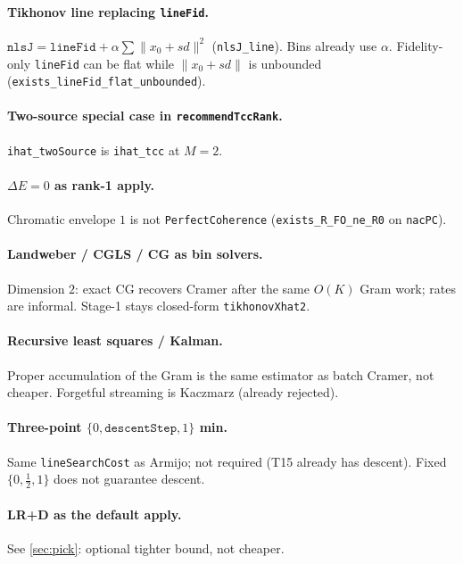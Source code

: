 \documentclass[11pt,a4paper]{article}
\theoremstyle{definition}
\theoremstyle{remark}
\newcommand{\norm}[1]{\lVert#1\rVert}
\begin{document}
\paragraph{Tikhonov line replacing \texttt{lineFid}.}
$\texttt{nlsJ}=\texttt{lineFid}+\alpha\sum\norm{x_0+sd}^2$
(\texttt{nlsJ\_line}).
Bins already use $\alpha$.
Fidelity-only \texttt{lineFid} can be flat while
$\norm{x_0+sd}$ is unbounded
(\texttt{exists\_lineFid\_flat\_unbounded}).

\paragraph{Two-source special case in \texttt{recommendTccRank}.}
\texttt{ihat\_twoSource} is \texttt{ihat\_tcc} at $M=2$.

\paragraph{$\Delta E=0$ as rank-1 apply.}
Chromatic envelope $1$ is not \texttt{PerfectCoherence}
(\texttt{exists\_R\_FO\_ne\_R0} on \texttt{nacPC}).

\paragraph{Landweber / CGLS / CG as bin solvers.}
Dimension $2$: exact CG recovers Cramer after the same $O(K)$ Gram
work; rates are informal.
Stage-1 stays closed-form \texttt{tikhonovXhat2}.

\paragraph{Recursive least squares / Kalman.}
Proper accumulation of the Gram is the same estimator as batch Cramer,
not cheaper.
Forgetful streaming is Kaczmarz (already rejected).

\paragraph{Three-point $\{0,\texttt{descentStep},1\}$ min.}
Same \texttt{lineSearchCost} as Armijo; not required (T15 already has
descent).
Fixed $\{0,\tfrac12,1\}$ does not guarantee descent.

\paragraph{LR+D as the default apply.}
See \cref{sec:pick}: optional tighter bound, not cheaper.
\end{document}
